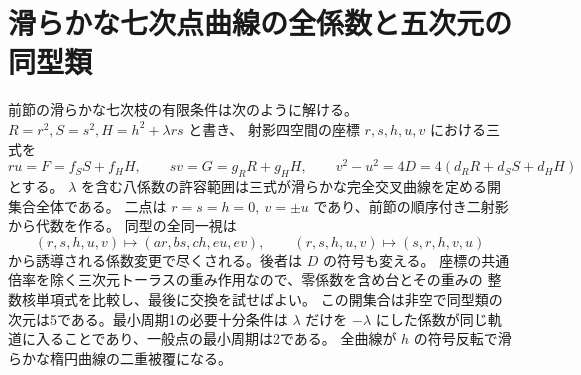 \section{滑らかな七次点曲線の全係数と五次元の同型類}
\label{sec:septic-bielliptic-forms}
\begin{theorem}\label{thm:septic-bielliptic-forms}
前節の滑らかな七次枝の有限条件は次のように解ける。$R=r^2,S=s^2,H=h^2+\lambda rs$ と書き、
射影四空間の座標 $r,s,h,u,v$ における三式を
\[
 ru=F=f_S S+f_H H,\qquad sv=G=g_R R+g_H H,\qquad
 v^2-u^2=4D=4(d_R R+d_S S+d_H H)
\]
とする。 $\lambda$ を含む八係数の許容範囲は三式が滑らかな完全交叉曲線を定める開集合全体である。
二点は $r=s=h=0,\ v=\pm u$ であり、前節の順序付き二射影から代数を作る。
同型の全同一視は
\[
 (r,s,h,u,v)\longmapsto (a r,b s,c h,e u,e v),\qquad
 (r,s,h,u,v)\longmapsto(s,r,h,v,u)
\]
から誘導される係数変更で尽くされる。後者は $D$ の符号も変える。
座標の共通倍率を除く三次元トーラスの重み作用なので、零係数を含め台とその重みの
整数核単項式を比較し、最後に交換を試せばよい。
この開集合は非空で同型類の次元は5である。最小周期1の必要十分条件は $\lambda$ だけを $-\lambda$ にした係数が同じ軌道に入ることであり、一般点の最小周期は2である。
全曲線が $h$ の符号反転で滑らかな楕円曲線の二重被覆になる。
\end{theorem}

